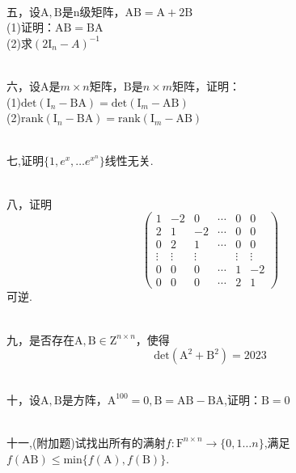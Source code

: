 \documentclass[12pt, a4paper, oneside]{ctexart}
\begin{document}
\;\\
五，设$\mathrm{A},\mathrm{B}$是n级矩阵，$\mathrm{A}\mathrm{B}=\mathrm{A}+2\mathrm{B}$\\
(1)证明：$\mathrm{A}\mathrm{B}=\mathrm{B}\mathrm{A}$\\
(2)求$(2\mathrm{I}_n-A)^{-1}$

\;\\
六，设$\mathrm{A}$是$m\times n$矩阵，$\mathrm{B}$是$n\times m$矩阵，证明：\\
(1)$\mathrm{det}(\mathrm{I}_n-\mathrm{B}\mathrm{A})=\mathrm{det}(\mathrm{I}_m-\mathrm{A}\mathrm{B})$\\
(2)$\mathrm{rank}(\mathrm{I}_n-\mathrm{B}\mathrm{A})=\mathrm{rank}(\mathrm{I}_m-\mathrm{A}\mathrm{B})$

\;\\
七,证明$\{1,e^x,\dots e^{x^n}\}$线性无关.

\;\\
八，证明
$$\left (\begin{array}{rrrrrr}
1 & -2 & 0 & \cdots & 0 & 0\\
2 & 1 & -2 & \cdots & 0 & 0\\
0 & 2 & 1 & \cdots & 0 & 0\\
\vdots & \vdots & \vdots & \; & \vdots &\vdots\\
0 & 0 & 0 & \cdots & 1 & -2\\
0 & 0 & 0 & \cdots & 2 & 1
\end{array}\right)$$
可逆.

\;\\
九，是否存在$\mathrm{A},\mathrm{B}\in \mathrm{Z}^{n\times n}$，使得
$$\mathrm{det}(\mathrm{A}^2+\mathrm{B}^2)=2023$$

\;\\
十，设$\mathrm{A},\mathrm{B}$是方阵，$\mathrm{A}^{100}=0,\mathrm{B}=\mathrm{A}\mathrm{B}-\mathrm{B}\mathrm{A}$,证明：$\mathrm{B}=0$

\;\\
十一,(附加题)试找出所有的满射$f:\mathrm{F}^{n\times n}\rightarrow \{0,1\dots n\}$,满足$f(\mathrm{A}\mathrm{B})\leq\mathrm{min}\{f(\mathrm{A}),f(\mathrm{B})\}$.
\end{document}
